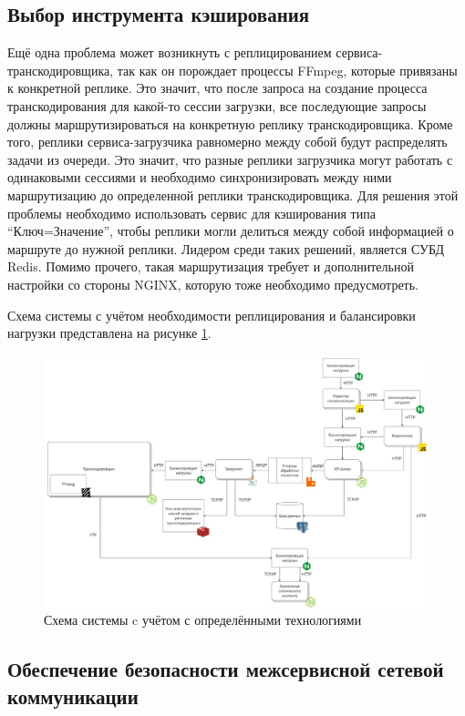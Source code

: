 	\subsection{Выбор инструмента кэширования}

	Ещё одна проблема может возникнуть с реплицированием сервиса-транскодировщика, так как он порождает процессы FFmpeg, которые привязаны к конкретной реплике. Это значит, что после запроса на создание процесса транскодирования для какой-то сессии загрузки, все последующие запросы должны маршрутизироваться на конкретную реплику транскодировщика. Кроме того, реплики сервиса-загрузчика равномерно между собой будут распределять задачи из очереди. Это значит, что разные реплики загрузчика могут работать с одинаковыми сессиями и необходимо синхронизировать между ними маршрутизацию до определенной реплики транскодировщика. Для решения этой проблемы необходимо использовать сервис для кэширования типа “Ключ=Значение”, чтобы реплики могли делиться между собой информацией о маршруте до нужной реплики. Лидером среди таких решений, является СУБД Redis. Помимо прочего, такая маршрутизация требует и дополнительной настройки со стороны NGINX, которую тоже необходимо предусмотреть.
	
	Схема системы с учётом необходимости реплицирования и балансировки нагрузки представлена на рисунке \ref{fig:system_scheme_6}.

	\begin{figure}[ht!] 
		\center
		\includegraphics [scale=0.37] {my_folder/images//system_scheme_6}
		\caption{Схема системы c учётом с определёнными технологиями} 
		\label{fig:system_scheme_6}  
	\end{figure}

	\subsection{Обеспечение безопасности межсервисной сетевой коммуникации}


